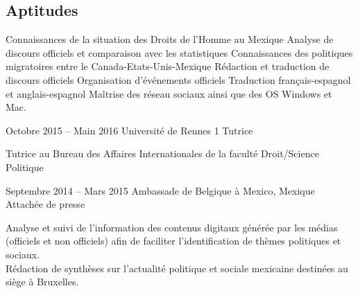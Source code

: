 \documentclass[30pt, french]{tccv}
\begin{document}
\begin{upshape}
\begin{competence}
\section{Aptitudes}
\begin{itemize}[leftmargin=13pt]
  \setlength\itemsep{-3pt} 
  \cvitem[\checkmark]  Connaissances de la situation des Droits de l’Homme au Mexique
  \cvitem[\checkmark]  Analyse de discours officiels et comparaison avec les statistiques
  \cvitem[\checkmark]  Connaissances des politiques migratoires entre le Canada-Etats-Unis-Mexique
  \cvitem[\checkmark]  Rédaction et traduction de discours officiels
  \cvitem[\checkmark]  Organisation d’événements officiels
  \cvitem[\checkmark]  Traduction français-espagnol et anglais-espagnol
  \cvitem[\checkmark]  Maîtrise des réseau sociaux ainsi que des OS Windows et Mac. 
\end{itemize}



\end{competence}




%
%


\begin{experience}

\vspace{2cm}
\item{\color{text} Octobre 2015 -- Main 2016}
     {Université de Rennes 1}
     {Tutrice}
     \fontsize{9pt}{1em}\color{text}\bodyfontlight\upshape\selectfont
     
     Tutrice au Bureau des Affaires Internationales de la faculté Droit/Science Politique

 
\vspace{3cm}
\item{Septembre 2014 -- Mars 2015}
     {Ambassade de Belgique à Mexico, Mexique}
     {Attachée de presse}
     \fontsize{9pt}{1em}\color{text}\bodyfontlight\upshape\selectfont

     Analyse et suivi de l’information des contenus digitaux générée par les médias (officiels et non officiels) afin de faciliter l’identification de thèmes politiques et sociaux. \\
     Rédaction de synthèses sur l’actualité politique et sociale mexicaine destinées au siège à Bruxelles.

\end{experience}






\end{upshape}
\end{document}
